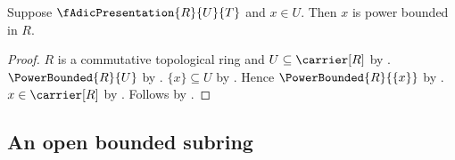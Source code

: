 \begin{corollary}\label{f_adic_presentation_element_power_bounded}
    Suppose $\fAdicPresentation{R}{U}{T}$ and $x\in U$.
    Then $x$ is power bounded in $R$.
\end{corollary}
\begin{proof}
    $R$ is a commutative topological ring and
        $U\subseteq\carrier[R]$ by .
    $\PowerBounded{R}{U}$ by
        .
    $\{x\}\subseteq U$ by .
    Hence $\PowerBounded{R}{\{x\}}$ by
        .
    $x\in\carrier[R]$ by .
    Follows by .
\end{proof}

\subsection{An open bounded subring}

